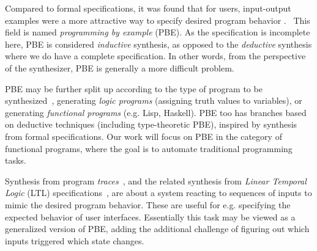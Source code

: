 \documentclass{article}
\begin{document}

Compared to formal specifications, it was found that for users,
input-output examples were a more attractive way to specify desired program behavior%
.~\citep{bodik2013algorithmic}
This field is named \emph{programming by example} (PBE).
As the specification is incomplete here, PBE is considered \emph{inductive} synthesis, as opposed to the \emph{deductive} synthesis where we do have a complete specification.
In other words, from the perspective of the synthesizer, PBE is generally a more difficult problem.

PBE may be further split up according to the type of program to be synthesized~\citep{bodik2013algorithmic},
generating \emph{logic programs} (assigning truth values to variables),
or generating \emph{functional programs} (e.g. Lisp, Haskell).
PBE too has branches based on deductive techniques (including type-theoretic PBE),
inspired by synthesis from formal specifications.
Our work will focus on PBE in the category of functional programs,
where the goal is to automate traditional programming tasks.


Synthesis from program \emph{traces}~\citep{koskimies1994automatic},
and the related synthesis from \emph{Linear Temporal Logic} (LTL)
specifications~\citep{camacho2019towards}, are about
a system reacting to sequences of inputs to mimic the desired program behavior.
These are useful for e.g. specifying the expected behavior of user interfaces.
Essentially this task may be viewed as a generalized version of PBE,
adding the additional challenge of figuring out which inputs triggered which state changes.

\end{document}
